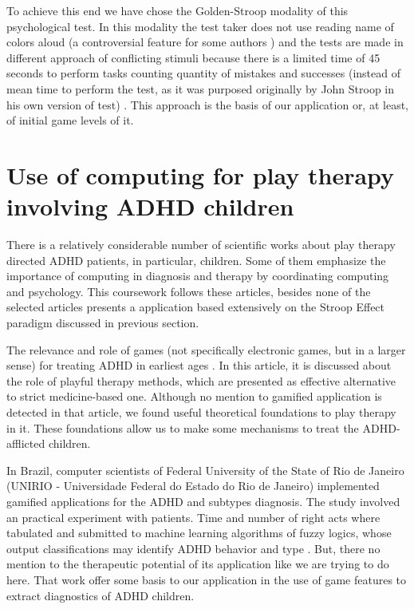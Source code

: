 To achieve this end we have chose the Golden-Stroop modality of this psychological test. In this modality the test taker does not use reading name of colors aloud (a controversial feature for some authors \citep{macleod}) and the tests are made in different approach of conflicting stimuli because there is a limited time of 45 seconds to perform tasks counting quantity of mistakes and successes (instead of mean time to perform the test, as it was purposed originally by John Stroop in his own version of test) \citep{goldencj}. This approach is the basis of our application or, at least, of initial game levels of it.

\section{Use of computing for play therapy involving ADHD children}

There is a relatively considerable number of scientific works about play therapy directed ADHD patients, in particular, children. Some of them emphasize the importance of computing in diagnosis and therapy by coordinating computing and psychology. This coursework follows these articles, besides none of the selected articles presents a application based extensively on the Stroop Effect paradigm discussed in previous section. 

The relevance and role of games (not specifically electronic games, but in a larger sense) for treating ADHD in earliest ages \citep{Psychoanalytic}. In this article, it is discussed about the role of playful therapy methods, which are presented as effective alternative to strict medicine-based one. Although no mention to gamified application is detected in that article, we found useful theoretical foundations to play therapy in it. These foundations allow us to make some mechanisms to treat the ADHD-afflicted children.

In Brazil, computer scientists of Federal University of the State of Rio de Janeiro (UNIRIO - Universidade Federal do Estado do Rio de Janeiro) implemented gamified applications for the ADHD and subtypes diagnosis. The study involved an practical experiment with patients. Time and number of right acts where tabulated and submitted to machine learning algorithms of fuzzy logics, whose output classifications may identify ADHD behavior  and type \citep{brasileiros}. But, there no mention to the therapeutic potential of its application like we are trying to do here. That work offer some basis to our application in the use of game features to extract diagnostics of ADHD children.

